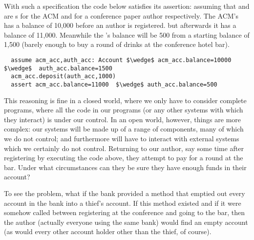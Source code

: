 
With such a specification %
the code below  satisfies its assertion: assuming that 
 and  are s for the ACM and
for a conference paper author respectively. The ACM's 
has a balance of 10,000 before an author is 
registered. but afterwards it has a balance of 11,000. Meanwhile the
's balance  will be 500 from a starting balance of 1,500
(barely enough to buy a round of drinks at the conference hotel bar).

\begin{lstlisting}
  assume acm_acc,auth_acc: Account $\wedge$ acm_acc.balance=10000 $\wedge$  auth_acc.balance=1500
  acm_acc.deposit(auth_acc,1000)
  assert acm_acc.balance=11000  $\wedge$ auth_acc.balance=500
\end{lstlisting}

\vspace{-.2in}

This reasoning is fine in a closed world, where we only have to
consider complete programs, where all the code in our programs (or any
other systems with which they interact) is under our control.   
In an
open world, however, things are more complex: our systems will be made
up of a range of 
components, many of which we do not control; and
furthermore will have to interact with external systems which we
certainly do not control.  Returning to our author, say some time
after registering by executing the  code above, they
attempt to pay for a round at the bar.  Under what circumstances can
they be sure they have enough funds in their account?

To see the problem, what if the bank provided a  method that 
 emptied out every account in the bank into a thief's account.
If this method existed and
if it were somehow called between registering at the conference and
going to the bar, then the author (actually everyone using the same bank)
would find an empty account (as would every other account holder other than the thief, of course).
%

